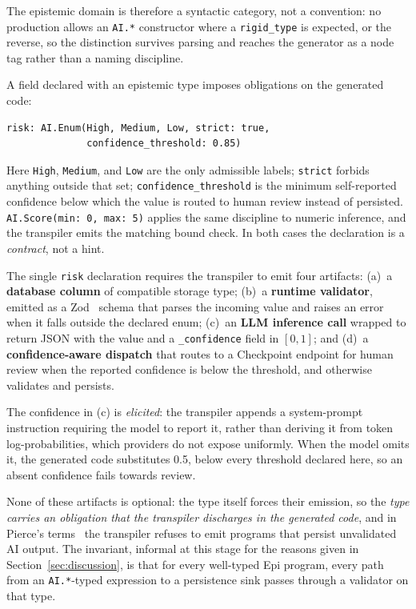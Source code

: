 \documentclass[sigconf]{acmart}
\begin{document}
The epistemic domain is therefore a syntactic category, not a convention: no production allows an \texttt{AI.*} constructor where a \texttt{rigid\_type} is expected, or the reverse, so the distinction survives parsing and reaches the generator as a node tag rather than a naming discipline.

A field declared with an epistemic type imposes obligations on the generated code:

\begin{verbatim}
risk: AI.Enum(High, Medium, Low, strict: true,
              confidence_threshold: 0.85)
\end{verbatim}

Here \texttt{High}, \texttt{Medium}, and \texttt{Low} are the only admissible labels; \texttt{strict} forbids anything outside that set; \texttt{confidence\_\allowbreak{}threshold} is the minimum self-reported confidence below which the value is routed to human review instead of persisted. \texttt{AI.Score(min: 0, max: 5)} applies the same discipline to numeric inference, and the transpiler emits the matching bound check. In both cases the declaration is a \emph{contract}, not a hint.

The single \texttt{risk} declaration requires the transpiler to emit four artifacts:
(a)~a \textbf{database column} of compatible storage type; (b)~a \textbf{runtime validator}, emitted as a Zod~\cite{zod} schema that parses the incoming value and raises an error when it falls outside the declared enum; (c)~an \textbf{LLM inference call} wrapped to return JSON with the value and a \texttt{\_confidence} field in $[0,1]$; and (d)~a \textbf{confidence-aware dispatch} that routes to a Checkpoint endpoint for human review when the reported confidence is below the threshold, and otherwise validates and persists.

The confidence in (c) is \emph{elicited}: the transpiler appends a system-prompt instruction requiring the model to report it, rather than deriving it from token log-probabilities, which providers do not expose uniformly. When the model omits it, the generated code substitutes 0.5, below every threshold declared here, so an absent confidence fails towards review.

None of these artifacts is optional: the type itself forces their emission, so the \emph{type carries an obligation that the transpiler discharges in the generated code}, and in Pierce's terms~\cite{pierce2002} the transpiler refuses to emit programs that persist unvalidated AI output. The invariant, informal at this stage for the reasons given in Section~\ref{sec:discussion}, is that for every well-typed Epi program, every path from an \texttt{AI.*}-typed expression to a persistence sink passes through a validator on that type.
\end{document}

